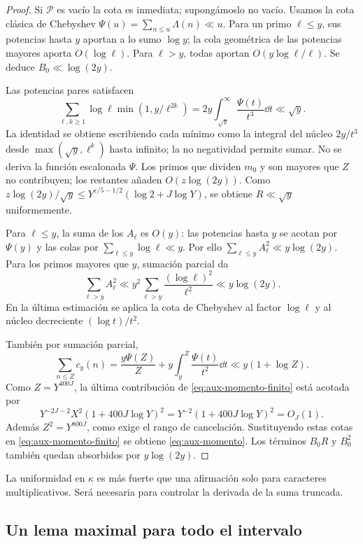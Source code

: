 \begin{proof}
Si $\mathcal P$ es vacío la cota es inmediata; supongámoslo no vacío.
Usamos la cota clásica de Chebyshev
$\Psi(u)=\sum_{n\le u}\Lambda(n)\ll u$.
Para un primo $\ell\le y$, sus potencias hasta $y$ aportan a lo sumo
$\log y$; la cola geométrica de las potencias mayores aporta
$O(\log\ell)$. Para $\ell>y$, todas aportan
$O(y\log\ell/\ell)$. Se deduce $B_0\ll\log(2y)$.

Las potencias pares satisfacen
\begin{equation}
 \sum_{\ell,k\ge1}\log\ell\min(1,y/\ell^{2k})
 =2y\int_{\sqrt y}^{\infty}\frac{\Psi(t)}{t^3}\dd t
 \ll\sqrt y.
 \label{eq:aux-pares}
\end{equation}
La identidad se obtiene escribiendo cada mínimo como la integral del
núcleo $2y/t^3$ desde $\max(\sqrt y,\ell^k)$ hasta infinito;
la no negatividad permite sumar. No se deriva la función escalonada
$\Psi$. Los primos que dividen $m_0$ y son mayores que $Z$ no
contribuyen; los restantes añaden $O(z\log(2y))$. Como
$z\log(2y)/\sqrt y\le Y^{\varepsilon/5-1/2}
(\log2+J\log Y)$, se obtiene $R\ll\sqrt y$ uniformemente.

Para $\ell\le y$, la suma de los $A_\ell$ es $O(y)$: las
potencias hasta $y$ se acotan por $\Psi(y)$ y las colas por
$\sum_{\ell\le y}\log\ell\ll y$.
Por ello $\sum_{\ell\le y}A_\ell^2\ll y\log(2y)$.
Para los primos mayores que $y$, sumación parcial da
\[
 \sum_{\ell>y}A_\ell^2
 \ll y^2\sum_{\ell>y}\frac{(\log\ell)^2}{\ell^2}
 \ll y\log(2y).
\]
En la última estimación se aplica la cota de Chebyshev al factor
$\log\ell$ y al núcleo decreciente $(\log t)/t^2$.

También por sumación parcial,
\[
 \sum_{n\le Z}c_y(n)
 =\frac{y\Psi(Z)}Z+y\int_y^Z\frac{\Psi(t)}{t^2}\dd t
 \ll y(1+\log Z).
\]
Como $Z=Y^{400J}$, la última contribución de
\eqref{eq:aux-momento-finito} está acotada por
\[
 Y^{-2J-2}X^2(1+400J\log Y)^2
 =Y^{-2}(1+400J\log Y)^2=O_J(1).
\]
Además $Z^2=Y^{800J}$, como exige el rango de cancelación.
Sustituyendo estas cotas en \eqref{eq:aux-momento-finito} se obtiene
\eqref{eq:aux-momento}. Los términos $B_0R$ y $B_0^2$ también
quedan absorbidos por $y\log(2y)$.
\end{proof}

La uniformidad en $\kappa$ es más fuerte que una afirmación solo
para caracteres multiplicativos. Será necesaria para controlar la
derivada de la suma truncada.

\subsection{Un lema maximal para todo el intervalo}

